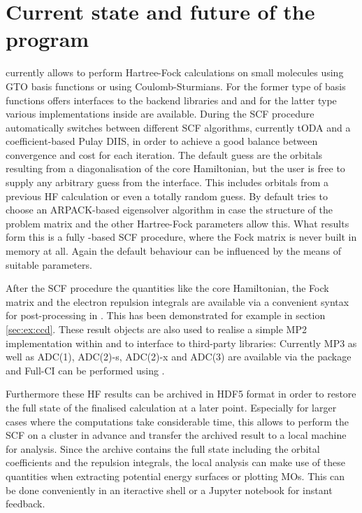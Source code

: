 \section{Current state and future of the program}
\label{sec:state}


\molsturm currently allows to perform Hartree-Fock calculations
on small molecules using GTO basis functions or using Coulomb-Sturmians.
For the former type of basis functions \gint offers interfaces
to the backend libraries \libint and \libcint and for the latter
type various implementations inside \sturmint are available.
During the SCF procedure \molsturm automatically switches between different
SCF algorithms, currently tODA and a coefficient-based Pulay DIIS,
in order to achieve a good balance between convergence and cost for each iteration.
The default guess are the orbitals resulting from a diagonalisation of the core Hamiltonian,
but the user is free to supply any arbitrary guess from the \python interface.
This includes orbitals from a previous HF calculation or even a totally random guess.
By default \molsturm tries to choose an ARPACK-based eigensolver algorithm
in case the structure of the problem matrix and the other Hartree-Fock
parameters allow this.
What results form this is a fully \contraction-based SCF procedure,
where the Fock matrix is never built in memory at all.
Again the default behaviour can be influenced by the means of suitable
parameters.

After the SCF procedure the quantities like the core Hamiltonian,
the Fock matrix and the electron repulsion integrals
are available via a convenient syntax for post-processing in \python.
This has been demonstrated for example in section \ref{sec:ex:ccd}.
These result objects are also used to realise a simple  MP2 implementation
within \molsturm and to interface to third-party libraries:
Currently MP3 as well as ADC(1), ADC(2)-s, ADC(2)-x and ADC(3)
are available via the \adcman package
and Full-CI can be performed using \pyscf.

Furthermore these HF results can be archived in HDF5 format
in order to restore the full state of the finalised calculation at a later point.
Especially for larger cases where the computations take considerable time,
this allows to perform the SCF on a cluster in advance and
transfer the archived result to a local machine for analysis.
Since the archive contains the full state
including the orbital coefficients and the repulsion integrals,
the local analysis can make use of these quantities
when extracting potential energy surfaces or plotting MOs.
This can be done conveniently in an iteractive \python shell
or a Jupyter notebook for instant feedback.

